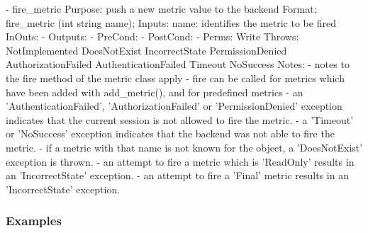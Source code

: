 \begin{myspec}
 
    - fire_metric
      Purpose:  push a new metric value to the backend
      Format:   fire_metric        (int  string  name);
      Inputs:   name:               identifies the metric to be 
                                    fired
      InOuts:   -
      Outputs:  -
      PreCond:  -
      PostCond: -
      Perms:    Write
      Throws:   NotImplemented
                DoesNotExist
                IncorrectState
                PermissionDenied
                AuthorizationFailed
                AuthenticationFailed
                Timeout
                NoSuccess
      Notes:    - notes to the fire method of the metric
                  class apply
                - fire can be called for metrics which have been
                  added with add_metric(), and for predefined
                  metrics
                - an 'AuthenticationFailed', 
                  'AuthorizationFailed' or 'PermissionDenied'
                  exception indicates that the current session
                  is not allowed to fire the metric.
                - a 'Timeout' or 'NoSuccess' exception indicates
                  that the backend was not able to fire the 
                  metric.
                - if a metric with that name is not known for 
                  the object, a 'DoesNotExist' exception 
                  is thrown.
                - an attempt to fire a metric which is
                  'ReadOnly' results in an 'IncorrectState' 
                  exception.
                - an attempt to fire a 'Final' metric results in
                  an 'IncorrectState' exception.
 \end{myspec}
 
 
 \subsubsection{Examples}
 
